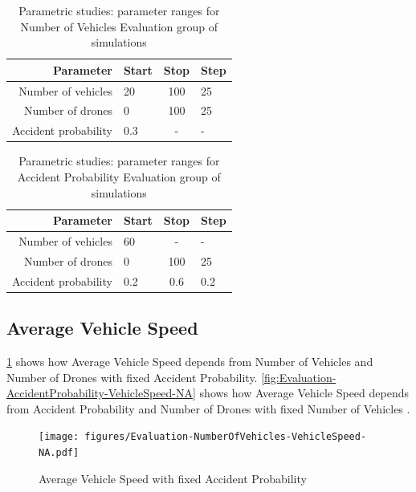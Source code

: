\documentclass[]{nsm-thesis}
\begin{document}
\begin{table}
    \centering
    \begin{tabular}{rlcl}
        \toprule
        Parameter & Start & Stop & Step \\
        \midrule
		Number of vehicles & 20 & 100 & 25 \\
		Number of drones & 0 & 100 & 25 \\
		Accident probability & 0.3 & - & - \\
        \bottomrule
    \end{tabular}
    \caption{Parametric studies: parameter ranges for Number of Vehicles Evaluation group of simulations}
    \label{tab:inputrange1}
\end{table}


\begin{table}
    \centering
    \begin{tabular}{rlcl}
        \toprule
        Parameter & Start & Stop & Step \\
        \midrule
		Number of vehicles & 60 & - & - \\
		Number of drones & 0 & 100 & 25 \\
		Accident probability & 0.2 & 0.6 & 0.2 \\
        \bottomrule
    \end{tabular}
    \caption{Parametric studies: parameter ranges for Accident Probability Evaluation group of simulations}
    \label{tab:inputrange2}
\end{table}

\subsection{Average Vehicle Speed}

\cref{fig:Evaluation-NumberOfVehicles-VehicleSpeed-NA} shows how Average Vehicle Speed depends from Number of Vehicles and Number of Drones with fixed Accident Probability. \cref{fig:Evaluation-AccidentProbability-VehicleSpeed-NA} shows how Average Vehicle Speed depends from  Accident Probability and Number of Drones with fixed Number of Vehicles . 

\begin{figure}
	\centering
	\texttt{[image: figures/Evaluation-NumberOfVehicles-VehicleSpeed-NA.pdf]}
	\caption{Average Vehicle Speed with fixed Accident Probability}
	\label{fig:Evaluation-NumberOfVehicles-VehicleSpeed-NA}
\end{figure}
\end{document}
